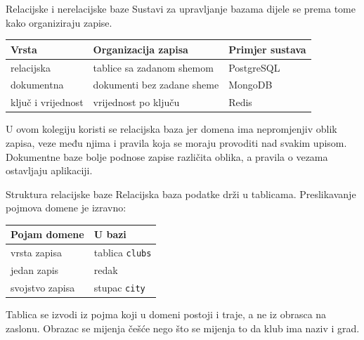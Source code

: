 \begin{frame}{Relacijske i nerelacijske baze}
Sustavi za upravljanje bazama dijele se prema tome kako organiziraju zapise.

\vspace{0.7em}
\begin{center}
{\small
\setlength{\tabcolsep}{8pt}
\renewcommand{\arraystretch}{1.4}
\begin{tabular}{@{}lll@{}}
  \toprule
  \textbf{Vrsta} & \textbf{Organizacija zapisa} & \textbf{Primjer sustava} \\
  \midrule
  relacijska         & tablice sa zadanom shemom  & PostgreSQL \\
  dokumentna         & dokumenti bez zadane sheme & MongoDB \\
  ključ i vrijednost & vrijednost po ključu       & Redis \\
  \bottomrule
\end{tabular}
}
\end{center}

\vspace{0.6em}
U ovom kolegiju koristi se relacijska baza jer domena ima nepromjenjiv oblik zapisa, veze među njima i pravila koja se moraju provoditi nad svakim upisom. Dokumentne baze bolje podnose zapise različita oblika, a pravila o vezama ostavljaju aplikaciji.
\end{frame}

\begin{frame}{Struktura relacijske baze}
Relacijska baza podatke drži u tablicama. Preslikavanje pojmova domene je izravno:

\vspace{0.7em}
\begin{center}
{\small
\setlength{\tabcolsep}{8pt}
\renewcommand{\arraystretch}{1.4}
\begin{tabular}{@{}ll@{}}
  \toprule
  \textbf{Pojam domene} & \textbf{U bazi} \\
  \midrule
  vrsta zapisa      & tablica \texttt{clubs} \\
  jedan zapis       & redak \\
  svojstvo zapisa   & stupac \texttt{city} \\
  \bottomrule
\end{tabular}
}
\end{center}

\vspace{0.6em}
Tablica se izvodi iz pojma koji u domeni postoji i traje, a ne iz obrasca na zaslonu. Obrazac se mijenja češće nego što se mijenja to da klub ima naziv i grad.
\end{frame}

